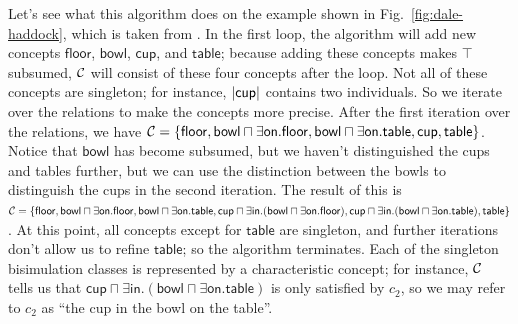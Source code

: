 
Let's see what this algorithm does on the example shown in
Fig.~\ref{fig:dale-haddock}, which is taken from
.  In the first loop,
the algorithm will add new concepts $\mathsf{floor}$, $\mathsf{bowl}$,
$\mathsf{cup}$, and $\mathsf{table}$; because adding these concepts
makes $\top$ subsumed, $\mathcal{C}$ will consist of these four concepts after
the loop.  Not all of these concepts are singleton; for instance,
$|\mathsf{cup}|$ contains two individuals.  So we iterate over
the relations to make the concepts more precise.  After the first
iteration over the relations, we have $\mathcal{C} = \{ \mathsf{floor},
\mathsf{bowl} \sqcap \exists \mathsf{on}.\mathsf{floor}, \mathsf{bowl}
\sqcap \exists \mathsf{on}.\mathsf{table}, \mathsf{cup},
\mathsf{table} \}$. Notice that $\mathsf{bowl}$ has become subsumed,
but we haven't distinguished the cups and tables further, but we can
use the distinction between the bowls to distinguish the cups in the
second iteration.  The result of this is $\mathcal{C} = \{ \mathsf{floor},
\mathsf{bowl} \sqcap \exists \mathsf{on}.\mathsf{floor}, \mathsf{bowl}
\sqcap \exists \mathsf{on}.\mathsf{table}, \mathsf{cup} \sqcap \exists
\mathsf{in}. (\mathsf{bowl} \sqcap \exists
\mathsf{on}.\mathsf{floor}), \mathsf{cup} \sqcap \exists
\mathsf{in}. (\mathsf{bowl} \sqcap \exists
\mathsf{on}.\mathsf{table}), \mathsf{table} \}$.  At this point, all
concepts except for $\mathsf{table}$ are singleton, and further
iterations don't allow us to refine $\mathsf{table}$; so the algorithm
terminates.  Each of the singleton bisimulation classes is represented
by a characteristic concept; for instance, $\mathcal{C}$ tells us that
$\mathsf{cup} \sqcap \exists \mathsf{in}. (\mathsf{bowl} \sqcap
\exists \mathsf{on}.\mathsf{table})$ is only satisfied by $c_2$, so we
may refer to $c_2$ as ``the cup in the bowl on the table''.

